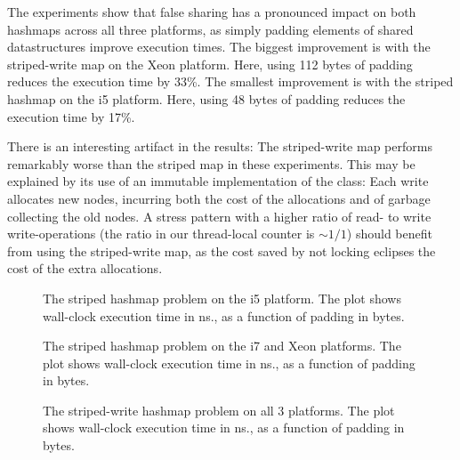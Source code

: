 The experiments show that false sharing has a pronounced impact on both hashmaps
across all three platforms, as simply padding elements of shared datastructures
improve execution times.
The biggest improvement is with the striped-write map on the Xeon platform.
Here, using 112 bytes of padding reduces the execution time by 33\%. The
smallest improvement is with the striped hashmap on the i5 platform. Here, using
48 bytes of padding reduces the execution time by 17\%.

There is an interesting artifact in the results: The striped-write map performs
remarkably worse than the striped map in these experiments. This may be
explained by its use of an immutable implementation of the 
class: Each write allocates new nodes, incurring both the cost of the
allocations and of garbage collecting the old nodes. A stress pattern with a
higher ratio of read- to write write-operations (the ratio in our thread-local
counter is $\sim 1/1$) should benefit from using the striped-write map, as the
cost saved by not locking eclipses the cost of the extra allocations.

\begin{figure}[hbpt]
\graphicspath{{plots/}}

\caption{The striped hashmap problem on the i5 platform. The plot shows
	wall-clock execution time in ns., as a function of padding in bytes.}
\label{fig:hashmap-striped-i5}
\end{figure}

\begin{figure}[hbpt]
\graphicspath{{plots/}}

\caption{The striped hashmap problem on the i7 and Xeon platforms. The plot shows
	wall-clock execution time in ns., as a function of padding in bytes.}
\label{fig:hashmap-striped-i7-xeon}
\end{figure}

\begin{figure}[hbpt]
\graphicspath{{plots/}}

\caption{The striped-write hashmap problem on all 3 platforms. The plot shows
	wall-clock execution time in ns., as a function of padding in bytes.}
\label{fig:hashmap-stripedwrite}
\end{figure}
